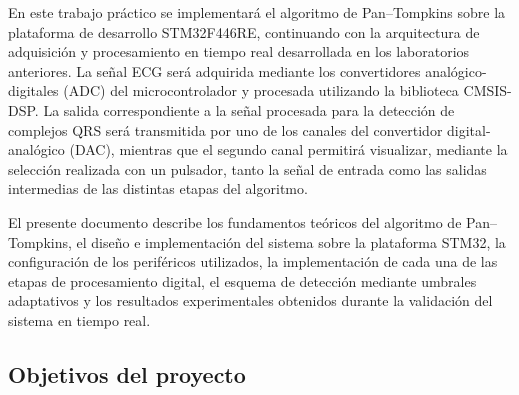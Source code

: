 \documentclass[12pt]{article}
\begin{document}
		En este trabajo práctico se implementará el algoritmo de Pan--Tompkins sobre la plataforma de desarrollo STM32F446RE, continuando con la arquitectura de adquisición y procesamiento en tiempo real desarrollada en los laboratorios anteriores. La señal ECG será adquirida mediante los convertidores analógico-digitales (ADC) del microcontrolador y procesada utilizando la biblioteca CMSIS-DSP. La salida correspondiente a la señal procesada para la detección de complejos QRS será transmitida por uno de los canales del convertidor digital-analógico (DAC), mientras que el segundo canal permitirá visualizar, mediante la selección realizada con un pulsador, tanto la señal de entrada como las salidas intermedias de las distintas etapas del algoritmo.

		El presente documento describe los fundamentos teóricos del algoritmo de Pan--Tompkins, el diseño e implementación del sistema sobre la plataforma STM32, la configuración de los periféricos utilizados, la implementación de cada una de las etapas de procesamiento digital, el esquema de detección mediante umbrales adaptativos y los resultados experimentales obtenidos durante la validación del sistema en tiempo real.

		\subsection{Objetivos del proyecto}
\end{document}
